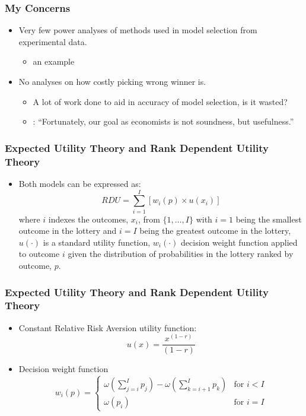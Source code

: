 \documentclass{beamer}
\begin{document}
\begin{frame}
\frametitle{My Concerns}
\begin{itemize}
	\item Very few power analyses of methods used in model selection from experimental data.
		\begin{itemize}
			\item \textcite{Wilcox2015} an example
		\end{itemize}
	\item No analyses on how costly picking wrong winner is.
		\begin{itemize}
			\item A lot of work done to aid in accuracy of model selection, is it wasted?
			\item \textcite[25]{Leamer2012}: \enquote{Fortunately, our goal as economists is not soundness, but usefulness.}
		\end{itemize}
\end{itemize}
\end{frame}

\begin{frame}
\frametitle{Expected Utility Theory and Rank Dependent Utility Theory}
\begin{itemize}
	\item Both models can be expressed as:
	\begin{equation}
		\label{eq4:RDU}
		RDU = \sum_{i=1}^{I} \left[ w_i(p) \times u(x_i) \right]
	\end{equation}
\noindent where $i$ indexes the outcomes, $x_i$, from $\{1,\ldots,I\}$ with $i=1$ being the smallest outcome in the lottery and $i=I$ being the greatest outcome in the lottery, $u(\cdot)$ is a standard utility function, $w_i(\cdot)$ decision weight function applied to outcome $i$ given the distribution of probabilities in the lottery ranked by outcome, $p$.
\end{itemize}
\end{frame}

\begin{frame}
\frametitle{Expected Utility Theory and Rank Dependent Utility Theory}
\begin{itemize}
	\item Constant Relative Risk Aversion utility function:
	\begin{equation}
		\label{eq4:CRRA}
		u(x) = \frac{x^{(1-r)}}{(1-r)}
	\end{equation}
	\item Decision weight function
	\begin{equation}
		\label{eq4:dweight}
		w_i(p) =
		\begin{cases}
			\omega\left(\displaystyle\sum_{j=i}^I p_j\right) - \omega\left(\displaystyle\sum_{k=i+1}^I p_k\right) & \text{for } i<I \\
			\omega(p_i) & \text{for } i = I
		\end{cases}
	\end{equation}
\end{itemize}
\end{frame}
\end{document}
